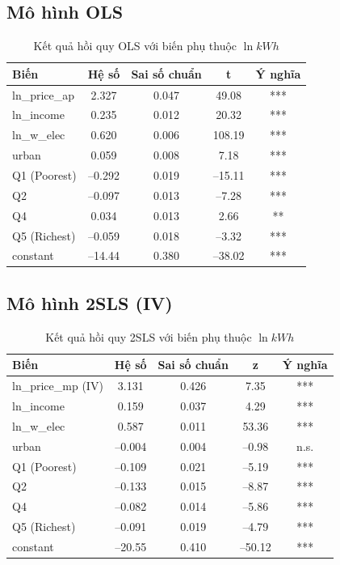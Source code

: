\documentclass[12pt,a4paper,oneside]{article}
\begin{document}
\subsection{Mô hình OLS}
\begin{table}[H]
	\centering
	\caption{Kết quả hồi quy OLS với biến phụ thuộc $\ln kWh$}
	\begin{tabular}{l c c c c}
		\toprule
		Biến & Hệ số & Sai số chuẩn & t & Ý nghĩa \\
		\midrule
		ln\_price\_ap & 2.327 & 0.047 & 49.08 & *** \\
		ln\_income & 0.235 & 0.012 & 20.32 & *** \\
		ln\_w\_elec & 0.620 & 0.006 & 108.19 & *** \\
		urban & 0.059 & 0.008 & 7.18 & *** \\
		Q1 (Poorest) & –0.292 & 0.019 & –15.11 & *** \\
		Q2 & –0.097 & 0.013 & –7.28 & *** \\
		Q4 & 0.034 & 0.013 & 2.66 & ** \\
		Q5 (Richest) & –0.059 & 0.018 & –3.32 & *** \\
		constant & –14.44 & 0.380 & –38.02 & *** \\
		\bottomrule
	\end{tabular}
\end{table}

\subsection{Mô hình 2SLS (IV)}
\begin{table}[H]
	\centering
	\caption{Kết quả hồi quy 2SLS với biến phụ thuộc $\ln kWh$}
	\begin{tabular}{l c c c c}
		\toprule
		Biến & Hệ số & Sai số chuẩn & z & Ý nghĩa \\
		\midrule
		ln\_price\_mp (IV) & 3.131 & 0.426 & 7.35 & *** \\
		ln\_income & 0.159 & 0.037 & 4.29 & *** \\
		ln\_w\_elec & 0.587 & 0.011 & 53.36 & *** \\
		urban & –0.004 & 0.004 & –0.98 & n.s. \\
		Q1 (Poorest) & –0.109 & 0.021 & –5.19 & *** \\
		Q2 & –0.133 & 0.015 & –8.87 & *** \\
		Q4 & –0.082 & 0.014 & –5.86 & *** \\
		Q5 (Richest) & –0.091 & 0.019 & –4.79 & *** \\
		constant & –20.55 & 0.410 & –50.12 & *** \\
		\bottomrule
	\end{tabular}
\end{table}
\end{document}
